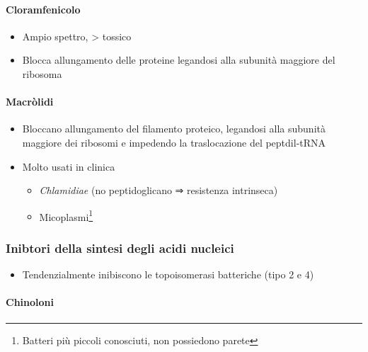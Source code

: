 \documentclass[italian,]{article}
\providecommand{\tightlist}{%
  \setlength{\itemsep}{0pt}\setlength{\parskip}{0pt}}
\begin{document}
\hypertarget{cloramfenicolo}{%
\paragraph{Cloramfenicolo}\label{cloramfenicolo}}

\begin{itemize}
\tightlist
\item
  Ampio spettro, \textgreater{} tossico
\item
  Blocca allungamento delle proteine legandosi alla subunità maggiore
  del ribosoma
\end{itemize}

\hypertarget{macruxf2lidi}{%
\paragraph{Macròlidi}\label{macruxf2lidi}}

\begin{itemize}
\tightlist
\item
  Bloccano allungamento del filamento proteico, legandosi alla subunità
  maggiore dei ribosomi e impedendo la traslocazione del peptdil-tRNA
\item
  Molto usati in clinica

  \begin{itemize}
  \tightlist
  \item
    \emph{Chlamidiae} (no peptidoglicano ⇒ resistenza intrinseca)
  \item
    Micoplasmi\footnote{Batteri più piccoli conosciuti, non possiedono
      parete}
  \end{itemize}
\end{itemize}

\hypertarget{inibtori-della-sintesi-degli-acidi-nucleici}{%
\subsubsection{Inibtori della sintesi degli acidi
nucleici}\label{inibtori-della-sintesi-degli-acidi-nucleici}}

\begin{itemize}
\tightlist
\item
  Tendenzialmente inibiscono le topoisomerasi batteriche (tipo 2 e 4)
\end{itemize}

\hypertarget{chinoloni}{%
\paragraph{Chinoloni}\label{chinoloni}}
\end{document}
